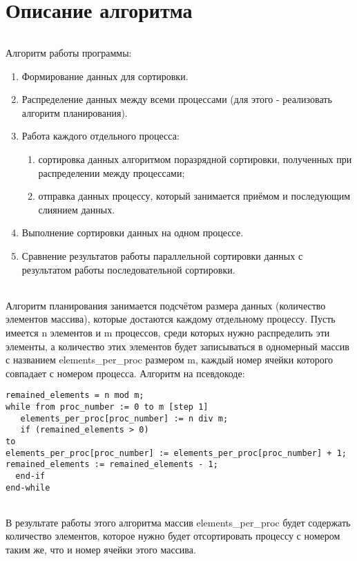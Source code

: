 \documentclass[12pt,a4paper]{article}
\begin{document}
\part*{Описание алгоритма}
\paragraph{}Алгоритм работы программы:
\begin{enumerate} 
\item Формирование данных для сортировки.
\item Распределение данных между всеми процессами (для этого - реализовать алгоритм планирования).
\item Работа каждого отдельного процесса:
\begin{enumerate}
    \item сортировка данных алгоритмом поразрядной сортировки, полученных при распределении между процессами;
    \item отправка данных процессу, который занимается приёмом и последующим слиянием данных.
\end{enumerate}
\item Выполнение сортировки данных на одном процессе.
\item Сравнение результатов работы параллельной сортировки данных с результатом работы последовательной сортировки.
\end{enumerate} 
\paragraph{}Алгоритм планирования занимается подсчётом размера данных (количество элементов массива), которые достаются каждому отдельному процессу. Пусть имеется n элементов и m процессов, среди которых нужно распределить эти элементы, а количество этих элементов будет записываться в одномерный массив с названием elements\_per\_proc размером m, каждый номер ячейки которого совпадает с номером процесса. Алгоритм на псевдокоде:
\begin{lstlisting}
remained_elements = n mod m;
while from proc_number := 0 to m [step 1]
   elements_per_proc[proc_number] := n div m;
   if (remained_elements > 0) 
to
elements_per_proc[proc_number] := elements_per_proc[proc_number] + 1;
remained_elements := remained_elements - 1;
  end-if
end-while
\end{lstlisting}
\paragraph{}В результате работы этого алгоритма массив elements\_per\_proc будет содержать количество элементов, которое нужно будет отсортировать процессу с номером таким же, что и номер ячейки этого массива.
\end{document}
